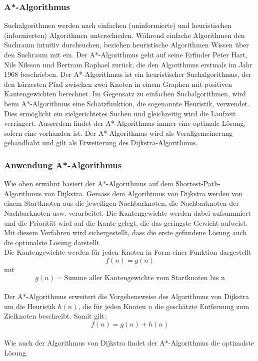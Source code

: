 \subsubsection{A*-Algorithmus}
Suchalgorithmen werden nach einfachen (uninformierte) und heuristischen (informierten) Algorithmen unterschieden. Während einfache Algorithmen den Suchraum intuitiv durchsuchen, beziehen heuristische Algorithmen Wissen über den Suchraum mit ein.
Der A*-Algorithmus geht auf seine Erfinder Peter Hart, Nils Nilsson und Bertram Raphael zurück, die den Algorithmus erstmals im Jahr 1968 beschrieben.
Der A*-Algorithmus ist ein heuristischer Suchalgorithmus, der den kürzesten Pfad zwischen zwei Knoten in einem Graphen mit positiven Kantengewichten berechnet.
Im Gegensatz zu einfachen Suchalgorithmen, wird beim A*-Algorithmus eine Schätzfunktion, die sogenannte Heuristik, verwendet. Dies ermöglicht ein zielgerichtetes Suchen und gleichzeitig wird die Laufzeit verringert.
Ausserdem findet der A*-Algorithmus immer eine optimale Lösung, sofern eine vorhanden ist.
Der A*-Algorithmus wird als Verallgemeinerung gehandhabt und gilt als Erweiterung des Dijkstra-Algorithmus.

\subsubsection{Anwendung A*-Algorithmus}
Wie oben erwähnt basiert der A*-Algorithmus auf dem Shortest-Path-Algorithmus von Dijkstra. Gemäss dem Algorihtmus von Dijkstra werden von einem Startknoten aus die jeweiligen Nachbarknoten, die Nachbarknoten der Nachbarknoten usw. verarbeitet. Die Kantengewichte werden dabei aufsummiert und die Priorität wird auf die Kante gelegt, die das geringste Gewicht aufweist. Mit diesem Verfahren wird sichergestellt, dass die erste gefundene Lösung auch die optimalste Lösung darstellt.\\

Die Kantengewichte werden für jeden Knoten in Form einer Funktion dargestellt
\begin{equation}f(n)=g(n)\end{equation} mit
\begin{equation}g(n)=\text{Summe aller Kantengewichte vom Startknoten bis n}\end{equation}\\
Der A*-Algorithmus erweitert die Vorgehensweise des Algorithmus von Dijkstra um die Heuristik $h(n)$, die für jeden Knoten $n$ die geschätzte Entfernung zum Zielknoten beschreibt.
Somit gilt:
\begin{equation}f(n)=g(n)+h(n)\end{equation}\\
Wie auch der Algorithmus von Dijkstra findet der A*-Algorithmus die optimalste Lösung.

